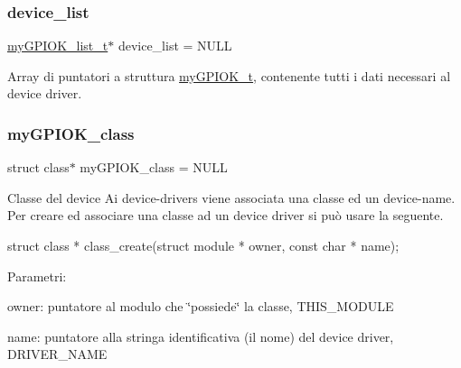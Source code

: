 \subsubsection{\texorpdfstring{device\+\_\+list}{device\_list}}
{\footnotesize\ttfamily \hyperlink{structmy_g_p_i_o_k__list__t}{my\+G\+P\+I\+O\+K\+\_\+list\+\_\+t}$\ast$ device\+\_\+list = N\+U\+LL\hspace{0.3cm}{\ttfamily [static]}}



Array di puntatori a struttura \hyperlink{structmy_g_p_i_o_k__t}{my\+G\+P\+I\+O\+K\+\_\+t}, contenente tutti i dati necessari al device driver. 

\mbox{\label{group___linux-_driver_gaaf8d1bce7d6389684a037e94381c275c}} 
\subsubsection{\texorpdfstring{my\+G\+P\+I\+O\+K\+\_\+class}{myGPIOK\_class}}
{\footnotesize\ttfamily struct class$\ast$ my\+G\+P\+I\+O\+K\+\_\+class = N\+U\+LL\hspace{0.3cm}{\ttfamily [static]}}



Classe del device Ai device-\/drivers viene associata una classe ed un device-\/name. Per creare ed associare una classe ad un device driver si può usare la seguente. 


\begin{DoxyCode}
\textcolor{keyword}{struct }class * class\_create(\textcolor{keyword}{struct} module * owner, \textcolor{keyword}{const} \textcolor{keywordtype}{char} * name);
\end{DoxyCode}
 Parametri\+:
\begin{DoxyItemize}
\item owner\+: puntatore al modulo che \char`\"{}possiede\char`\"{} la classe, T\+H\+I\+S\+\_\+\+M\+O\+D\+U\+LE
\item name\+: puntatore alla stringa identificativa (il nome) del device driver, D\+R\+I\+V\+E\+R\+\_\+\+N\+A\+ME 
\end{DoxyItemize}\mbox{\label{group___linux-_driver_ga8dba1541b58fa63f8208232ffce4fc47}} 
